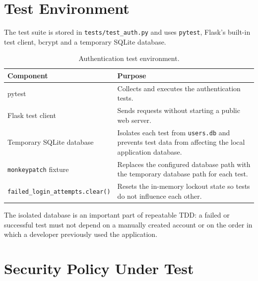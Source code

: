 \documentclass[11pt,a4paper]{article}
\begin{document}
\section{Test Environment}

The test suite is stored in \texttt{tests/test\_auth.py} and uses \texttt{pytest},
Flask's built-in test client, bcrypt and a temporary SQLite database.

\begin{table}[h]
\centering
\begin{tabularx}{\textwidth}{@{}lY@{}}
\toprule
\textbf{Component} & \textbf{Purpose} \\
\midrule
pytest & Collects and executes the authentication tests. \\
Flask test client & Sends requests without starting a public web server. \\
Temporary SQLite database & Isolates each test from \texttt{users.db} and prevents
test data from affecting the local application database. \\
\texttt{monkeypatch} fixture & Replaces the configured database path with the
temporary database path for each test. \\
\texttt{failed\_login\_attempts.clear()} & Resets the in-memory lockout state so
tests do not influence each other. \\
\bottomrule
\end{tabularx}
\caption{Authentication test environment.}
\end{table}

The isolated database is an important part of repeatable TDD: a failed or
successful test must not depend on a manually created account or on the order in
which a developer previously used the application.

\section{Security Policy Under Test}
\end{document}
